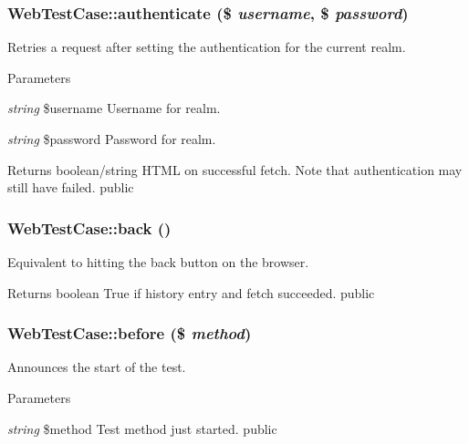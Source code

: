 \hypertarget{class_web_test_case_a09a9ef390ae02778cfab67678d72db62}{
\subsubsection[{authenticate}]{\setlength{\rightskip}{0pt plus 5cm}WebTestCase::authenticate (\$ {\em username}, \/  \$ {\em password})}}
\label{class_web_test_case_a09a9ef390ae02778cfab67678d72db62}
Retries a request after setting the authentication for the current realm. 
\begin{DoxyParams}{Parameters}
\item[{\em string}]\$username Username for realm. \item[{\em string}]\$password Password for realm. \end{DoxyParams}
\begin{DoxyReturn}{Returns}
boolean/string HTML on successful fetch. Note that authentication may still have failed.  public 
\end{DoxyReturn}
\hypertarget{class_web_test_case_a76f85e79d4ff8679a869af826186c6e9}{
\subsubsection[{back}]{\setlength{\rightskip}{0pt plus 5cm}WebTestCase::back ()}}
\label{class_web_test_case_a76f85e79d4ff8679a869af826186c6e9}
Equivalent to hitting the back button on the browser. \begin{DoxyReturn}{Returns}
boolean True if history entry and fetch succeeded.  public 
\end{DoxyReturn}
\hypertarget{class_web_test_case_a87f5e5088a08ea1b2588c3fcfdb2ead3}{
\subsubsection[{before}]{\setlength{\rightskip}{0pt plus 5cm}WebTestCase::before (\$ {\em method})}}
\label{class_web_test_case_a87f5e5088a08ea1b2588c3fcfdb2ead3}
Announces the start of the test. 
\begin{DoxyParams}{Parameters}
\item[{\em string}]\$method Test method just started.  public \end{DoxyParams}
